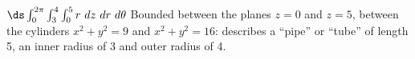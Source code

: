 {
$\ds \int_0^{2\pi}\int_3^4\int_0^5 r\ dz\ dr\ d\theta$
}
{Bounded between the planes $z=0$ and $z=5$, between the cylinders $x^2+y^2=9$ and $x^2+y^2=16$: describes a ``pipe'' or ``tube'' of length 5, an inner radius of 3 and outer radius of 4.
}
